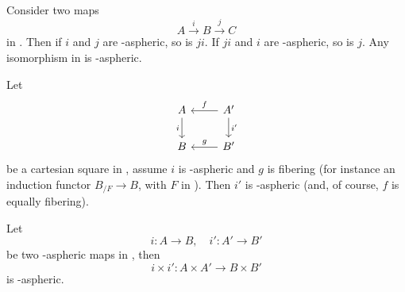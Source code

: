 \begin{propositionnum}\label{prop:72.3}
  \textup{}\enspace
  Consider two maps
  \[ A \xrightarrow i B \xrightarrow j C\]
  in \Cat. Then if $i$ and $j$ are \scrW-aspheric, so is $ji$. If $ji$
  and $i$ are \scrW-aspheric, so is $j$. Any isomorphism in \Cat{} is
  \scrW-aspheric.

  \textup{}\enspace
  Let
  \[\begin{tikzcd}
    A \ar[d,swap,"i"] & A' \ar[l,swap,"f"]\ar[d,"i'"] \\
    B & B' \ar[l,swap,"g"]
  \end{tikzcd}\]
  be a cartesian square in \Cat, assume $i$ is \scrW-aspheric and $g$
  is fibering \textup(for instance an induction functor $B_{/F}\to B$,
  with $F$ in \Bhat\textup). Then $i'$ is \scrW-aspheric \textup(and,
  of course, $f$ is equally fibering\textup).
  
  \textup{}\enspace
  Let
  \[i:A\to B, \quad i':A'\to B'\]
  be two \scrW-aspheric maps in \Cat, then
  \[ i\times i' : A\times A' \to B\times B'\]
  is \scrW-aspheric.
\end{propositionnum}
